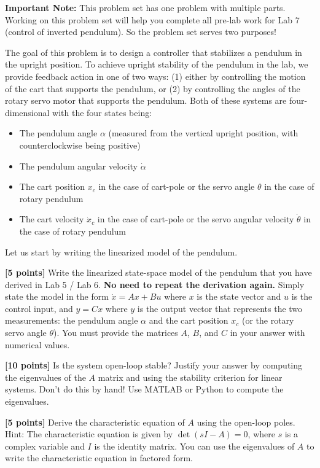 \documentclass{ee122_pset}
\author{\rule{3cm}{0.4pt}} %
\begin{document}
\textbf{Important Note:} This problem set has one problem with multiple parts. Working on this problem set will help you complete all pre-lab work for Lab 7 (control of inverted pendulum). So the problem set serves two purposes!


The goal of this problem is to design a controller that stabilizes a pendulum in the upright position. To achieve upright stability of the pendulum in the lab, we provide feedback action in one of two ways: (1) either by controlling the motion of the cart that supports the pendulum, or (2) by controlling the angles of the rotary servo motor that supports the pendulum. Both of these systems are four-dimensional with the four states being: 
\begin{itemize}
\item The pendulum angle $\alpha$ (measured from the vertical upright position, with counterclockwise being positive)
\item The pendulum angular velocity $\dot{\alpha}$
\item The cart position $x_c$ in the case of cart-pole or the servo angle $\theta$ in the case of rotary pendulum
\item The cart velocity $\dot{x}_c$ in the case of cart-pole or the servo angular velocity $\dot{\theta}$ in the case of rotary pendulum
\end{itemize} 

Let us start by writing the linearized model of the pendulum. 

\problempart \textbf{[5 points]} Write the linearized state-space model of the pendulum that you have derived in Lab 5 / Lab 6. \textbf{No need to repeat the derivation again.} Simply state the model in the form $\dot x = Ax + Bu$ where $x$ is the state vector and $u$ is the control input, and $y = Cx$ where $y$ is the output vector that represents the two measurements: the pendulum angle $\alpha$ and the cart position $x_c$ (or the rotary servo angle $\theta$). You must provide the matrices $A$, $B$, and $C$ in your answer with numerical values.

\problempart \textbf{[10 points]} Is the system open-loop stable? Justify your answer by computing the eigenvalues of the $A$ matrix and using the stability criterion for linear systems. Don't do this by hand! Use MATLAB or Python to compute the eigenvalues.

\problempart \textbf{[5 points]} Derive the characteristic equation of $A$ using the open-loop poles. 
\medskip 
Hint: The characteristic equation is given by $\det(sI - A) = 0$, where $s$ is a complex variable and $I$ is the identity matrix. You can use the eigenvalues of $A$ to write the characteristic equation in factored form.
\end{document}
